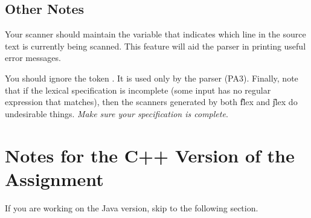 \documentclass[11pt]{article}
\begin{document}

\subsection{Other Notes}

Your scanner should maintain the variable  that
indicates which line in the source text is currently being scanned.
This feature will aid the parser in printing useful error messages.

You should ignore the token .  It is used only by the
parser (PA3).  Finally, note that if the lexical specification is
incomplete (some input has no regular expression that matches), then
the scanners generated by both \U{flex} and \U{jlex} do undesirable
things.  {\em Make sure your specification is complete}.


\section{Notes for the C++ Version of the Assignment}

If you are working on the Java version, skip to the following section.
\end{document}
